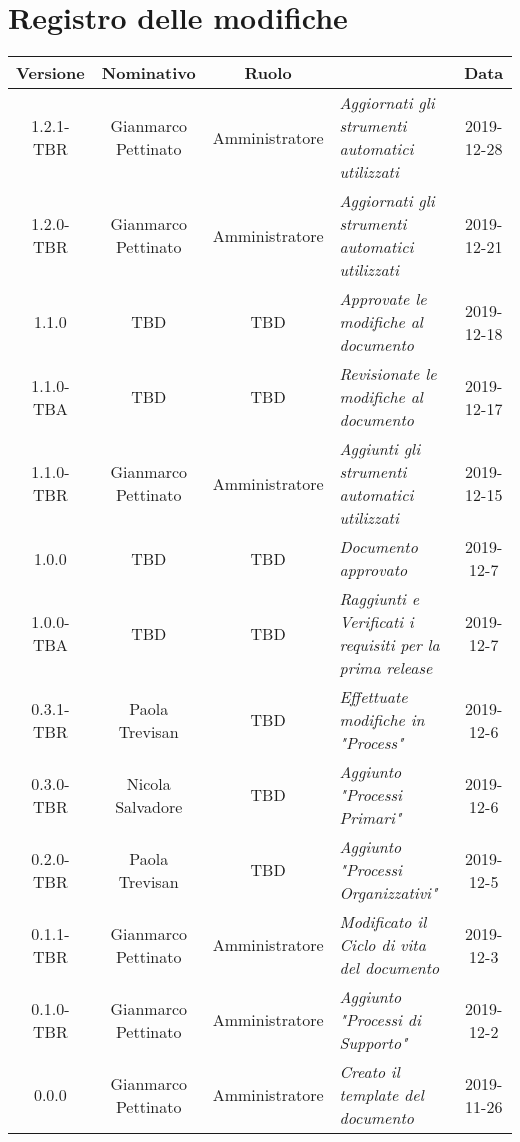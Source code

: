 \section*{Registro delle modifiche}
\renewcommand{\arraystretch}{1.8}

  \begin{longtable}{|c|c|c|p{3.8cm}|c|}
    \hline

    \rowcolor{header}
    \textbf{Versione} & \textbf{Nominativo} & \textbf{Ruolo} & \centering{\textbf{Descrizione}} & \textbf{Data}\\
    \hline
    1.2.1-TBR & Gianmarco Pettinato & Amministratore & \small{\textit{Aggiornati gli strumenti automatici utilizzati}}& 2019-12-28\\
    \hline
    1.2.0-TBR & Gianmarco Pettinato & Amministratore & \small{\textit{Aggiornati gli strumenti automatici utilizzati}}& 2019-12-21\\
    \hline
    1.1.0 & TBD & TBD & \small{\textit{Approvate le modifiche al documento}}& 2019-12-18\\
    \hline
    1.1.0-TBA & TBD & TBD & \small{\textit{Revisionate le modifiche al documento}} & 2019-12-17\\
    \hline
    1.1.0-TBR & Gianmarco Pettinato & Amministratore & \small{\textit{Aggiunti gli strumenti automatici utilizzati}} & 2019-12-15\\
    \hline
    1.0.0 & TBD & TBD & \small{\textit{Documento approvato}} & 2019-12-7\\
    \hline
    1.0.0-TBA & TBD & TBD &\small{\textit{Raggiunti e Verificati i requisiti per la prima release}} & 2019-12-7\\
    \hline
    0.3.1-TBR & Paola Trevisan & TBD & \small{\textit{Effettuate modifiche in "Process"}} & 2019-12-6\\
    \hline
    0.3.0-TBR & Nicola Salvadore & TBD & \small{\textit{Aggiunto "Processi Primari" }} & 2019-12-6\\
    \hline
    0.2.0-TBR & Paola Trevisan & TBD & \small{\textit{Aggiunto "Processi Organizzativi"}} & 2019-12-5\\
    \hline
    0.1.1-TBR & Gianmarco Pettinato & Amministratore & \small{\textit{Modificato il Ciclo di vita del documento}} & 2019-12-3\\
    \hline
    0.1.0-TBR & Gianmarco Pettinato & Amministratore & \small{\textit{Aggiunto "Processi di Supporto"}} & 2019-12-2\\
    \hline
    0.0.0 & Gianmarco Pettinato & Amministratore & \small{\textit{Creato il template del documento}} & 2019-11-26\\
    \hline
  \end{longtable}
